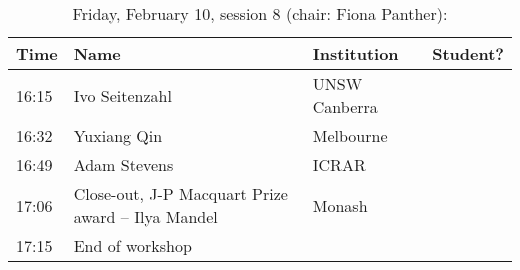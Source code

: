 \documentclass[amsmath,onecolumn]{revtex4-1}
\begin{document}
\begin{table}[!htbp]
	\centering
	\caption{Friday, February 10, session 8 (chair: Fiona Panther):}
\begin{tabular}{| l | l | l | c |}
	\hline
	Time & Name  & Institution & Student? \\ 		
	\hline
	16:15 & {Ivo Seitenzahl} & UNSW Canberra &  \\
	16:32 & {Yuxiang Qin} & Melbourne &  \\
	16:49 & {Adam Stevens} & ICRAR &  \\
	17:06 & Close-out, J-P Macquart Prize award -- Ilya Mandel & Monash & \\
	17:15 & End of workshop & & \\
	\hline
\end{tabular}
\end{table}
\end{document}
